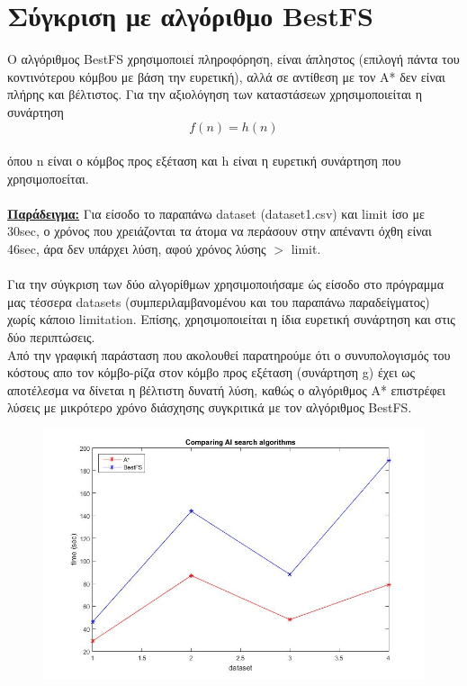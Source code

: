 \documentclass[12pt]{article}
\begin{document}
\section*{Σύγκριση με αλγόριθμο BestFS}
Ο αλγόριθμος BestFS χρησιμοποιεί πληροφόρηση, είναι άπληστος (επιλογή πάντα του κοντινότερου κόμβου με βάση την ευρετική), αλλά σε αντίθεση με τον A* δεν είναι πλήρης και βέλτιστος.  Για την αξιολόγηση των καταστάσεων χρησιμοποιείται η συνάρτηση
 \begin{equation*}
        f(n) = h(n)
\end{equation*}\\
όπου n είναι ο κόμβος προς εξέταση και h είναι η ευρετική συνάρτηση που χρησιμοποείται.\\\\
\textbf{\underline{Παράδειγμα:}} Για είσοδο το παραπάνω dataset (dataset1.csv) και limit ίσο με 30sec, ο χρόνος που χρειάζονται τα άτομα να περάσουν στην απέναντι όχθη είναι 46sec, άρα δεν υπάρχει λύση, αφού χρόνος λύσης $>$ limit.\\\\
Για την σύγκριση των δύο αλγορίθμων χρησιμοποιήσαμε ώς είσοδο στο πρόγραμμα μας τέσσερα datasets (συμπεριλαμβανομένου και του παραπάνω παραδείγματος) χωρίς κάποιο limitation. Επίσης, χρησιμοποιείται η ίδια ευρετική συνάρτηση και στις δύο περιπτώσεις.\\
Από την γραφική παράσταση που ακολουθεί παρατηρούμε ότι ο συνυπολογισμός του κόστους απο τον κόμβο-ρίζα στον κόμβο προς εξέταση (συνάρτηση g) έχει ως αποτέλεσμα να δίνεται η βέλτιστη δυνατή λύση, καθώς ο αλγόριθμος A* επιστρέφει λύσεις με μικρότερο χρόνο διάσχησης συγκριτικά με τον αλγόριθμος BestFS.
\begin{figure}[H]
        \centering
        \includegraphics[scale=.7]{images/ai_res}
     \end{figure}
\end{document}
